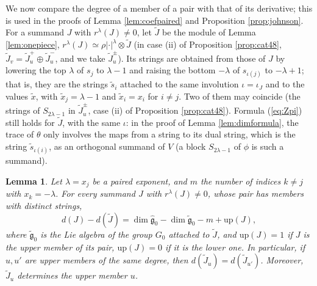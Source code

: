 \documentclass[a4paper,12pt,leqno]{amsart}
\theoremstyle{plain}
\newtheorem{lemma}[thm]{Lemma}
\theoremstyle{definition}
\begin{document}
\noindent We now compare the degree of a member of a pair with that of its derivative; this is used in the
proofs of Lemma \ref{lem:coefpaired} and Proposition \ref{prop:johnson}. For a summand $J$ with
$r^\lambda(J)\neq0$, let $\widetilde J$ be the module of Lemma
\ref{lem:onepiece}, $r^\lambda(J)\simeq\rho|\cdot|^\lambda\otimes\widetilde J$ (in case (ii) of Proposition \ref{prop:cat48},
$\widetilde J_v=\widetilde J_u^+\oplus\widetilde J_u^-$, and we take $\widetilde J_u^\pm$). Its
strings are obtained from those of $J$ by lowering the top $\lambda$ of $s_j$ to $\lambda-1$ and raising
the bottom $-\lambda$ of $s_{\iota(j)}$ to $-\lambda+1$; that is, they are the strings $\widetilde s_i$
attached to the same involution $\iota=\iota_J$ and to the values $\widetilde x$, with $\widetilde
x_j=\lambda-1$ and $\widetilde x_i=x_i$ for $i\neq j$. Two of them may coincide (the strings of
$S_{2\lambda-1}$ in $\widetilde J_u^\pm$, case (ii) of Proposition \ref{prop:cat48}). Formula (\ref{eq:Zpi}) still holds for
$\widetilde J$, with the same $\iota$: in the proof of Lemma \ref{lem:dimformula}, the trace of $\theta$
only involves the maps from a string to its dual string, which is the string $\widetilde s_{\iota(i)}$, as
an orthogonal summand of $V$ (a block $S_{2\lambda-1}$ of $\phi$ is such a summand).

\begin{lemma}\label{lem:degtilde} Let $\lambda=x_j$ be a paired exponent, and $m$ the number of indices
$k\neq j$ with $x_k=-\lambda$. For every summand $J$ with $r^\lambda(J)\neq0$, whose pair
has members with distinct strings,
\[d(J)-d(\widetilde J)=\dim\widehat{\mathfrak g}_0-\dim\widetilde{\mathfrak g}_0-m+\mathrm{up}(J),\]
where $\widetilde{\mathfrak g}_0$ is the Lie algebra of the group $G_0$ attached to $\widetilde J$, and
$\mathrm{up}(J)=1$ if $J$ is the upper member of its pair, $\mathrm{up}(J)=0$ if it is the lower one.
In particular, if $u,u'$ are upper members of the same degree, then $d(\widetilde J_u)=d(\widetilde
J_{u'})$. Moreover, $\widetilde J_u$ determines the upper member $u$.
\end{lemma}
\end{document}
